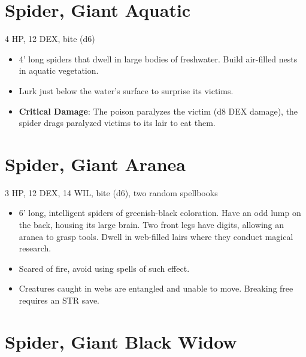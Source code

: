 \documentclass[
  10pt,
  american,
]{article}
\begin{document}
\hypertarget{spider-giant-aquatic}{%
\section{Spider, Giant Aquatic}\label{spider-giant-aquatic}}

4 HP, 12 DEX, bite (d6)

\begin{samepage}
\begin{itemize}
\setlength\itemsep{-.5em}
\item 4’ long spiders that dwell in large bodies of freshwater. Build air-filled nests in aquatic vegetation.
\item Lurk just below the water's surface to surprise its victims.
\item \textbf{Critical Damage}: The poison paralyzes the victim (d8 DEX damage), the spider drags paralyzed victims to its lair to eat them.
\end{itemize}
\end{samepage}

\hypertarget{spider-giant-aranea}{%
\section{Spider, Giant Aranea}\label{spider-giant-aranea}}

3 HP, 12 DEX, 14 WIL, bite (d6), two random spellbooks

\begin{samepage}
\begin{itemize}
\setlength\itemsep{-.5em}
\item 6’ long, intelligent spiders of greenish-black coloration. Have an odd lump on the back, housing its large brain. Two front legs have digits, allowing an aranea to grasp tools. Dwell in web-filled lairs where they conduct magical research.
\item  Scared of fire, avoid using spells of such effect.
\item Creatures caught in webs are entangled and unable to move. Breaking free requires an STR save.
\end{itemize}
\end{samepage}

\hypertarget{spider-giant-black-widow}{%
\section{Spider, Giant Black Widow}\label{spider-giant-black-widow}}
\end{document}
